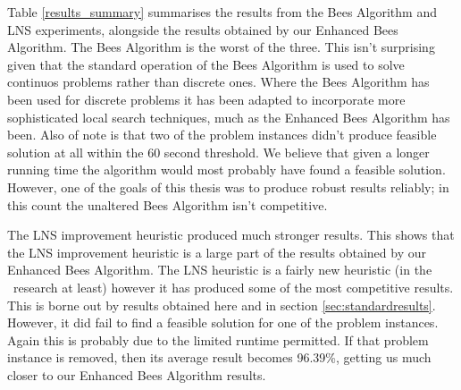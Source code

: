 Table \ref{results_summary} summarises the results from the Bees Algorithm and LNS experiments, alongside the results obtained by our Enhanced Bees Algorithm. The Bees Algorithm is the worst of the three. This isn't surprising given that the standard operation of the Bees Algorithm is used to solve continuos problems rather than discrete ones. Where the Bees Algorithm has been used for discrete problems it has been adapted to incorporate more sophisticated local search techniques, much as the Enhanced Bees Algorithm has been. Also of note is that two of the problem instances didn't produce feasible solution at all within the 60 second threshold. We believe that given a longer running time the algorithm would most probably have found a feasible solution. However, one of the goals of this thesis was to produce robust results reliably; in this count the unaltered Bees Algorithm isn't competitive. 

The LNS improvement heuristic produced much stronger results. This shows that the LNS improvement heuristic is a large part of the results obtained by our Enhanced Bees Algorithm. The LNS heuristic is a fairly new heuristic (in the \VRP\ research at least) however it has produced some of the most competitive results. This is borne out by results obtained here and in section \ref{sec:standardresults}. However, it did fail to find a feasible solution for one of the problem instances. Again this is probably due to the limited runtime permitted. If that problem instance is removed, then its average result becomes 96.39\%, getting us much closer to our Enhanced Bees Algorithm results.

